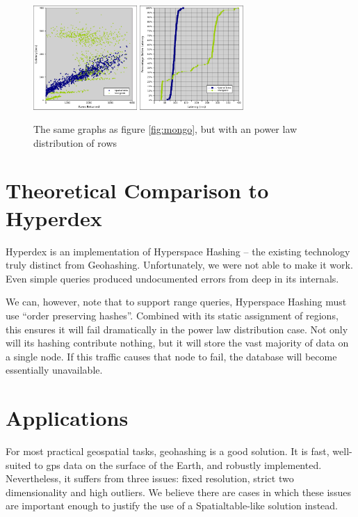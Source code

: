 \documentclass[11pt]{article}
\begin{document}
\begin{figure}[h]
\includegraphics[width=1.55in]{st_mongo_exp}
\includegraphics[width=1.55in]{st_mongo_exp_cumu}
\caption{The same graphs as figure \ref{fig:mongo}, but with an power law distribution of rows}
\label{fig:mongoexp}
\end{figure}

\section{Theoretical Comparison to Hyperdex}

Hyperdex is an implementation of Hyperspace Hashing -- the existing technology truly distinct from Geohashing.  Unfortunately, we were not able to make it work.  Even simple queries produced undocumented errors from deep in its internals.

We can, however, note that to support range queries, Hyperspace Hashing must use ``order preserving hashes''.  Combined with its static assignment of regions, this ensures it will fail dramatically in the power law distribution case.  Not only will its hashing contribute nothing, but it will store the vast majority of data on a single node.  If this traffic causes that node to fail, the database will become essentially unavailable.

\section{Applications}

For most practical geospatial tasks, geohashing is a good solution.  It is fast, well-suited to gps data on the surface of the Earth, and robustly implemented.  Nevertheless, it suffers from three issues: fixed resolution, strict two dimensionality and high outliers.  We believe there are cases in which these issues are important enough to justify the use of a Spatialtable-like solution instead.
\end{document}
